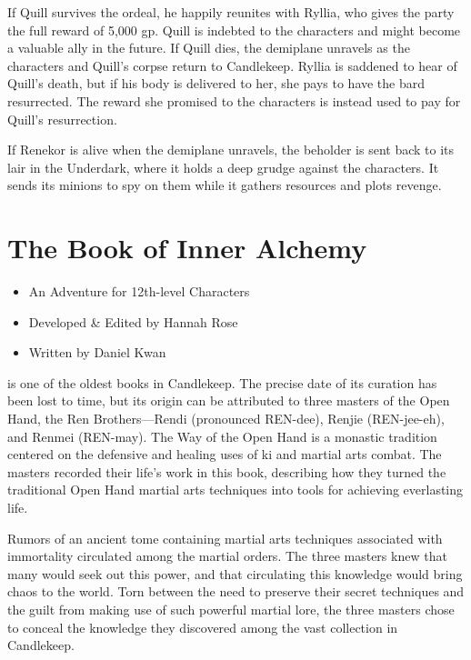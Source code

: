 \documentclass[10pt,a4paper,twoside,bg=print,twocolumn,openany,nodeprecatedcode]{dndbook}
\begin{document}
If Quill survives the ordeal, he happily reunites with Ryllia, who gives the party the full reward of 5,000 gp. Quill is indebted to the characters and might become a valuable ally in the future. If Quill dies, the demiplane unravels as the characters and Quill's corpse return to Candlekeep. Ryllia is saddened to hear of Quill's death, but if his body is delivered to her, she pays to have the bard resurrected. The reward she promised to the characters is instead used to pay for Quill's resurrection.

If Renekor is alive when the demiplane unravels, the beholder is sent back to its lair in the Underdark, where it holds a deep grudge against the characters. It sends its minions to spy on them while it gathers resources and plots revenge.

\chapter{The Book of Inner Alchemy}

\begin{itemize}
\item An Adventure for 12th-level Characters
\item Developed \& Edited by Hannah Rose
\item Written by Daniel Kwan
\end{itemize}

 is one of the oldest books in Candlekeep. The precise date of its curation has been lost to time, but its origin can be attributed to three masters of the Open Hand, the Ren Brothers—Rendi (pronounced REN-dee), Renjie (REN-jee-eh), and Renmei (REN-may). The Way of the Open Hand is a monastic tradition centered on the defensive and healing uses of ki and martial arts combat. The masters recorded their life's work in this book, describing how they turned the traditional Open Hand martial arts techniques into tools for achieving everlasting life.


Rumors of an ancient tome containing martial arts techniques associated with immortality circulated among the martial orders. The three masters knew that many would seek out this power, and that circulating this knowledge would bring chaos to the world. Torn between the need to preserve their secret techniques and the guilt from making use of such powerful martial lore, the three masters chose to conceal the knowledge they discovered among the vast collection in Candlekeep.
\end{document}
